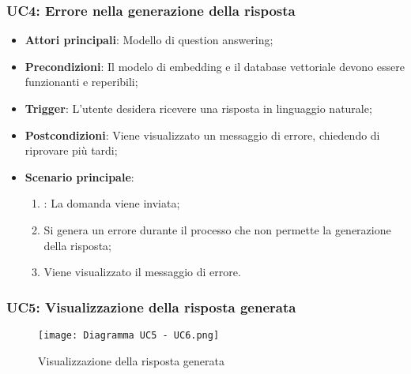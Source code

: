 \hypertarget{UC4}{}
\subsubsection{UC4: Errore nella generazione della risposta}

\begin{itemize}
    \item \textbf{Attori principali}: Modello di question answering;
    \item \textbf{Precondizioni}: Il modelo di embedding e il database vettoriale devono essere funzionanti e reperibili;
    \item \textbf{Trigger}: L'utente desidera ricevere una risposta in linguaggio naturale;
    \item \textbf{Postcondizioni}: Viene visualizzato un messaggio di errore, chiedendo di riprovare più tardi;
    \item \textbf{Scenario principale}:
    \begin{enumerate}
        \item {}: La domanda viene inviata;
        \item Si genera un errore durante il processo che non permette la generazione della risposta;
        \item Viene visualizzato il messaggio di errore.
    \end{enumerate}
\end{itemize}

\newpage
\hypertarget{UC5}{}
\subsubsection{UC5: Visualizzazione della risposta generata}

\begin{figure}[h]
    \centering
    \texttt{[image: Diagramma UC5 - UC6.png]}
    \caption{Visualizzazione della risposta generata}
\end{figure}


